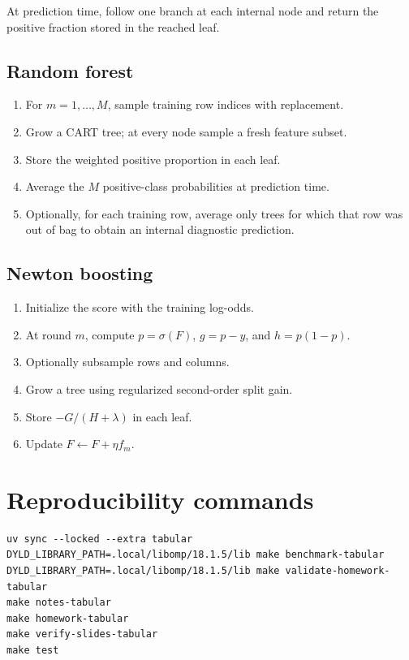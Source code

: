 \documentclass[11pt]{article}
\begin{document}
At prediction time, follow one branch at each internal node and return the
positive fraction stored in the reached leaf.

\subsection{Random forest}

\begin{enumerate}
\item For $m=1,\ldots,M$, sample training row indices with replacement.
\item Grow a CART tree; at every node sample a fresh feature subset.
\item Store the weighted positive proportion in each leaf.
\item Average the $M$ positive-class probabilities at prediction time.
\item Optionally, for each training row, average only trees for which that row
was out of bag to obtain an internal diagnostic prediction.
\end{enumerate}

\subsection{Newton boosting}

\begin{enumerate}
\item Initialize the score with the training log-odds.
\item At round $m$, compute $p=\sigma(F)$, $g=p-y$, and $h=p(1-p)$.
\item Optionally subsample rows and columns.
\item Grow a tree using regularized second-order split gain.
\item Store $-G/(H+\lambda)$ in each leaf.
\item Update $F\leftarrow F+\eta f_m$.
\end{enumerate}

\section{Reproducibility commands}

\begin{verbatim}
uv sync --locked --extra tabular
DYLD_LIBRARY_PATH=.local/libomp/18.1.5/lib make benchmark-tabular
DYLD_LIBRARY_PATH=.local/libomp/18.1.5/lib make validate-homework-tabular
make notes-tabular
make homework-tabular
make verify-slides-tabular
make test
\end{verbatim}
\end{document}
